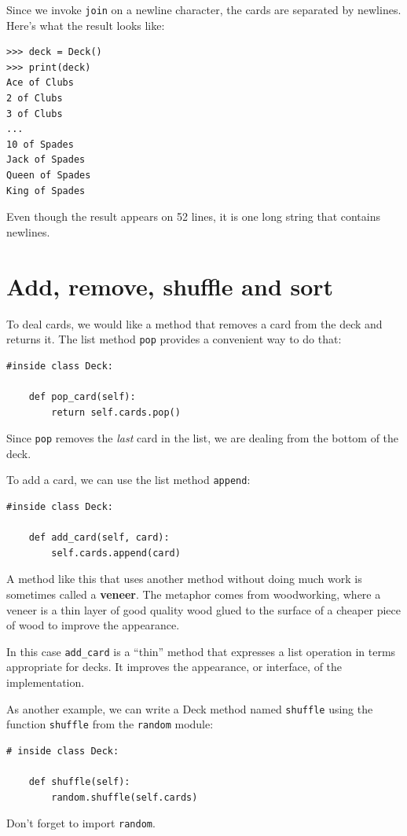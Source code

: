 \documentclass[10pt]{book}
\begin{document}
Since we invoke {\tt join} on a newline character, the cards
are separated by newlines.  Here's what the result looks like:

\begin{verbatim}
>>> deck = Deck()
>>> print(deck)
Ace of Clubs
2 of Clubs
3 of Clubs
...
10 of Spades
Jack of Spades
Queen of Spades
King of Spades
\end{verbatim}
%
Even though the result appears on 52 lines, it is
one long string that contains newlines.


\section{Add, remove, shuffle and sort}

To deal cards, we would like a method that
removes a card from the deck and returns it.
The list method {\tt pop} provides a convenient way to do that:

\begin{verbatim}
#inside class Deck:

    def pop_card(self):
        return self.cards.pop()
\end{verbatim}
%
Since {\tt pop} removes the {\em last} card in the list, we are
dealing from the bottom of the deck.

To add a card, we can use the list method {\tt append}:

\begin{verbatim}
#inside class Deck:

    def add_card(self, card):
        self.cards.append(card)
\end{verbatim}
%
A method like this that uses another method without doing
much work is sometimes called a {\bf veneer}.  The metaphor
comes from woodworking, where a veneer is a thin
layer of good quality wood glued to the surface of a cheaper piece of
wood to improve the appearance.

In this case \verb"add_card" is a ``thin'' method that expresses
a list operation in terms appropriate for decks.  It
improves the appearance, or interface, of the
implementation.

As another example, we can write a Deck method named {\tt shuffle}
using the function {\tt shuffle} from the {\tt random} module:

\begin{verbatim}
# inside class Deck:
            
    def shuffle(self):
        random.shuffle(self.cards)
\end{verbatim}
%
Don't forget to import {\tt random}.
\end{document}
